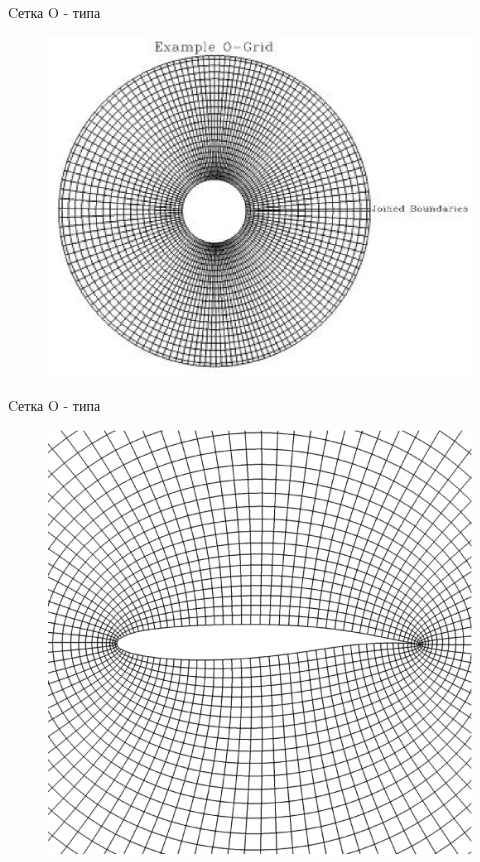 \documentclass[10pt,xcolor=pst,aspectratio=169]{beamer}
\begin{document}
\begin{frame}{Cетка O - типа}

	\transdissolve[duration=0.1]
	\justifying
	\large

	\begin{figure}
		\includegraphics[width=0.7\linewidth]{O_type_grid_example_1.eps}
	\end{figure}

\end{frame}

\begin{frame}{Cетка O - типа}

	\transdissolve[duration=0.1]
	\justifying
	\large

	\begin{figure}
		\includegraphics[width=0.5\linewidth]{O_type_grid_example_2.eps}
	\end{figure}

\end{frame}
\end{document}
